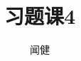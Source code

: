 \documentclass[12pt]{article}
\newcommand{\hei}{\CJKfamily{hei}}                          %
\begin{document}
\author{闻健}
\title{习题课4}
\maketitle

\medskip

\begin{enumerate}

%
%	

\end{enumerate}
\end{document}
